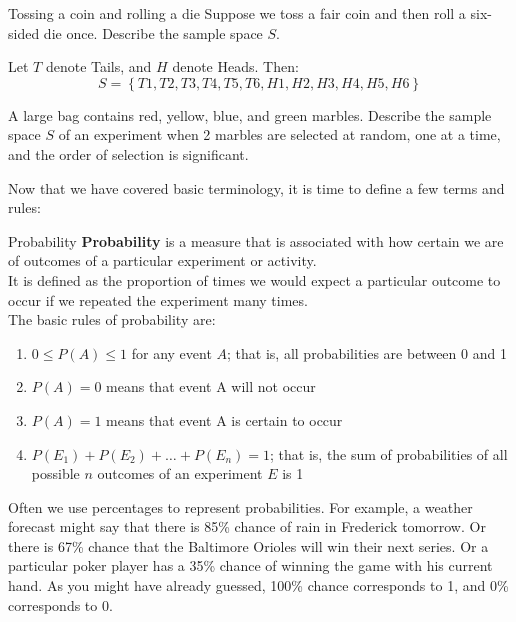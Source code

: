 \begin{example}[https://www.youtube.com/watch?v=hD3-sONaoHk]{Tossing a coin and rolling a die}
Suppose we toss a fair coin and then roll a six-sided die once. Describe the sample space $S$.

\sol

 Let $T$ denote Tails, and $H$ denote Heads. Then:
\[  S = \boxed{\left\{T 1, T 2, T 3, T 4, T 5, T 6, H 1, H 2, H 3, H 4, H 5, H 6 \right\}} \]
\end{example}

\begin{try}
A large bag contains red, yellow, blue, and green marbles. Describe the sample space $S$ of an experiment when 2 marbles are selected at random, one at a time, and the order of selection is significant.
\end{try}
\vfill
\pagebreak

Now that we have covered basic terminology, it is time to define a few terms and rules:
\begin{proc}{Probability}
\textbf{Probability} is a measure that is associated with how certain we are of outcomes of a particular experiment or activity. \\ 

It is defined as the proportion of times we would expect a particular outcome to occur if we repeated the experiment many times.\\

The basic rules of probability are:
\begin{enumerate}
	\item $0 \leq P(A) \leq 1$ for any event $A$; that is, all probabilities are between 0 and 1
	\item $P(A) = 0$ means that event A will not occur
	\item $P(A) = 1$ means that event A is certain to occur
	\item $P(E_1) + P(E_2) + \dots + P(E_n) = 1 $; that is, the sum of probabilities of all possible $n$ outcomes of an experiment $E$ is 1
\end{enumerate}
\end{proc}

Often we use percentages to represent probabilities. For example, a weather forecast might say that there is 85\% chance of rain in Frederick tomorrow. Or there is 67\% chance that the Baltimore Orioles will win their next series. Or a particular poker player has a 35\% chance of winning the game with his current hand. As you might have already guessed, 100\% chance corresponds to 1, and 0\% corresponds to 0.

